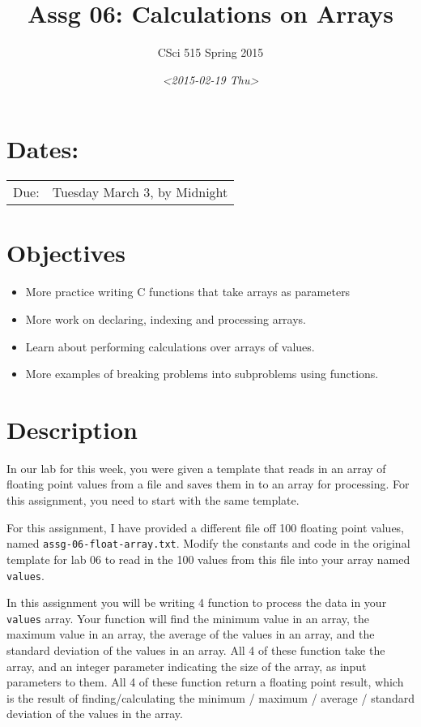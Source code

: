 \documentclass[11pt]{article}
\author{CSci 515 Spring 2015}
\date{\textit{<2015-02-19 Thu>}}
\title{Assg 06: Calculations on Arrays}
\begin{document}
\maketitle

\section*{Dates:}
\label{sec-1}
\begin{center}
\begin{tabular}{ll}
Due: & Tuesday March 3, by Midnight\\
\end{tabular}
\end{center}
\section*{Objectives}
\label{sec-2}
\begin{itemize}
\item More practice writing C functions that take arrays as parameters
\item More work on declaring, indexing and processing arrays.
\item Learn about performing calculations over arrays of values.
\item More examples of breaking problems into subproblems using functions.
\end{itemize}
\section*{Description}
\label{sec-3}
In our lab for this week, you were given a template that reads in an array
of floating point values from a file and saves them in to an array for processing.
For this assignment, you need to start with the same template.

For this assignment, I have provided a different file off 100 floating
point values, named \verb~assg-06-float-array.txt~.  Modify the constants and
code in the original template for lab 06 to read in the 100 values
from this file into your array named \verb~values~.

In this assignment you will be writing 4 function to process the data
in your \verb~values~ array.  Your function will find the minimum value in
an array, the maximum value in an array, the average of the values in
an array, and the standard deviation of the values in an array.  All 4
of these function take the array, and an integer parameter indicating
the size of the array, as input parameters to them.  All 4 of these
function return a floating point result, which is the result of
finding/calculating the minimum / maximum / average / standard
deviation of the values in the array.
\end{document}
